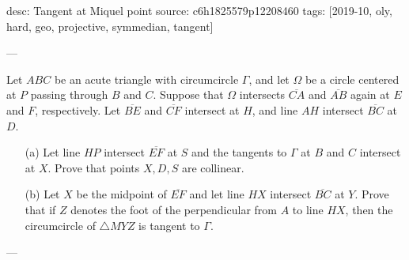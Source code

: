 desc: Tangent at Miquel point
source: c6h1825579p12208460
tags: [2019-10, oly, hard, geo, projective, symmedian, tangent]

---

Let $ABC$ be an acute triangle with circumcircle $\Gamma$, and let $\Omega$ be a circle centered at $P$ passing through $B$ and $C$. Suppose that $\Omega$ intersects $\overline{CA}$ and $\overline{AB}$ again at $E$ and $F$, respectively. Let $\overline{BE}$ and $\overline{CF}$ intersect at $H$, and line $AH$ intersect $\overline{BC}$ at $D$.
\begin{itemize}
    \item[(a)] Let line $HP$ intersect $\overline{EF}$ at $S$ and the tangents to $\Gamma$ at $B$ and $C$ intersect at $X$. Prove that points $X,D,S$ are collinear.
        \vspace{-0.5em}
    \item[(b)] Let $X$ be the midpoint of $\overline{EF}$ and let line $HX$ intersect $\overline{BC}$ at $Y$. Prove that if $Z$ denotes the foot of the perpendicular from $A$ to line $HX$, then the circumcircle of $\triangle MYZ$ is tangent to $\Gamma$.
\end{itemize}

---

